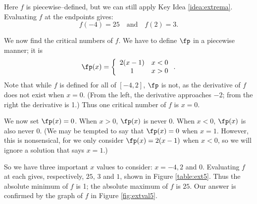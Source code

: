 {Here $f$ is piecewise--defined, but we can still apply Key Idea \ref{idea:extrema}. Evaluating $f$ at the endpoints gives: 
$$ f(-4) = 25 \quad \text{and} \quad f(2) = 3.$$

We now find the critical numbers of $f$. We have to define $\fp$ in a piecewise manner; it is $$\fp(x) =\left\{\begin{array}{cc} 2(x-1) & x < 0 \\ 1 & x>0 \end{array}\right. .$$ Note that while $f$ is defined for all of $[-4,2]$, $\fp$ is not, as the derivative of $f$ does not exist when $x=0$. (From the left, the derivative approaches $-2$; from the right the derivative is 1.) Thus one critical number of $f$ is $x=0$.

We now set $\fp(x) = 0$. When $x >0$, $\fp(x)$ is never 0.  When $x<0$, $\fp(x)$ is also never 0. (We may be tempted to say that $\fp(x) = 0 $ when $x=1$. However, this is nonsensical, for we only consider $\fp(x) = 2(x-1)$ when $x<0$, so we will ignore a solution that says $x=1$.) 

So we have three important $x$ values to consider: $x= -4, 2$ and $0$. Evaluating $f$ at each gives, respectively, $25$, $3$ and $1$, shown in Figure \ref{table:ext5}. Thus the absolute minimum of $f$ is 1; the absolute maximum of $f$ is $25$. Our answer is confirmed by the graph of $f$ in Figure \ref{fig:extval5}.
}\\
\clearpage
{}
